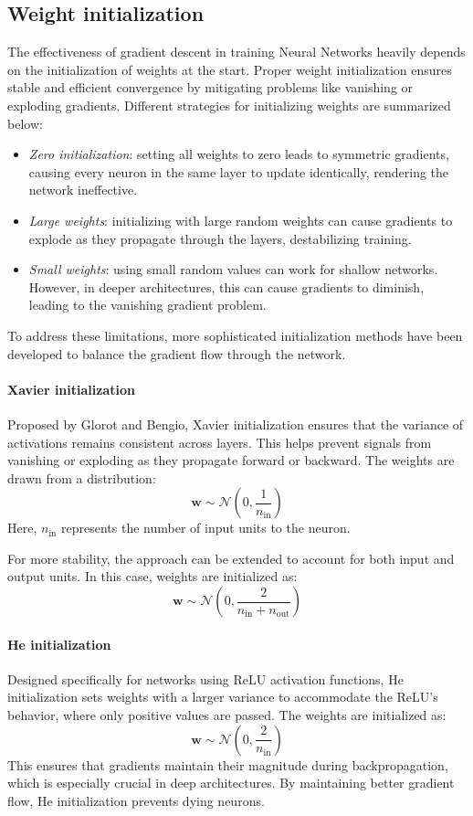 \subsection{Weight initialization}
The effectiveness of gradient descent in training Neural Networks heavily depends on the initialization of weights at the start. 
Proper weight initialization ensures stable and efficient convergence by mitigating problems like vanishing or exploding gradients. 
Different strategies for initializing weights are summarized below:
\begin{itemize}
    \item \textit{Zero initialization}: setting all weights to zero leads to symmetric gradients, causing every neuron in the same layer to update identically, rendering the network ineffective.
    \item \textit{Large weights}: initializing with large random weights can cause gradients to explode as they propagate through the layers, destabilizing training.
    \item \textit{Small weights}: using small random values can work for shallow networks. 
        However, in deeper architectures, this can cause gradients to diminish, leading to the vanishing gradient problem.
\end{itemize}
To address these limitations, more sophisticated initialization methods have been developed to balance the gradient flow through the network.

\paragraph*{Xavier initialization}
Proposed by Glorot and Bengio, Xavier initialization ensures that the variance of activations remains consistent across layers. 
This helps prevent signals from vanishing or exploding as they propagate forward or backward. 
The weights are drawn from a distribution:
\[\mathbf{w}\sim \mathcal{N}\left(0,\frac{1}{n_{\text{in}}}\right)\]
Here, $n_{\text{in}}$ represents the number of input units to the neuron.

For more stability, the approach can be extended to account for both input and output units. 
In this case, weights are initialized as:
\[\mathbf{w}\sim \mathcal{N}\left(0,\frac{2}{n_{\text{in}}+n_{\text{out}}}\right)\]

\paragraph*{He initialization}
Designed specifically for networks using ReLU activation functions, He initialization sets weights with a larger variance to accommodate the ReLU's behavior, where only positive values are passed. 
The weights are initialized as:
\[\mathbf{w}\sim \mathcal{N}\left(0,\frac{2}{n_{\text{in}}}\right)\]
This ensures that gradients maintain their magnitude during backpropagation, which is especially crucial in deep architectures. 
By maintaining better gradient flow, He initialization prevents dying neurons. 